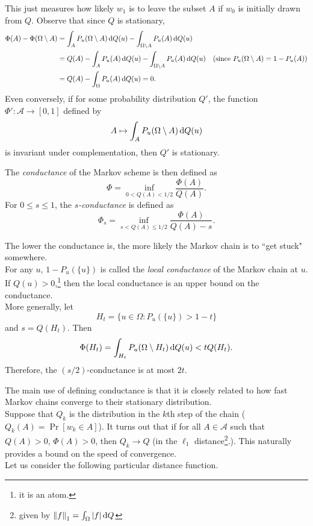 This just measures how likely $w_1$ is to leave the subset $A$ if $w_0$ is initially drawn from $Q$. Observe that since $Q$ is stationary,
\begin{align*}
    \Phi(A) - \Phi(\Omega\setminus A) &= \int_A P_u(\Omega\setminus A)\operatorname{d}\!{Q}(u) - \int_{\Omega\setminus A} P_u(A)\operatorname{d}\!{Q}(u) \\
    &= Q(A) - \int_A P_u(A)\operatorname{d}\!{Q}(u) - \int_{\Omega\setminus A} P_u(A)\operatorname{d}\!{Q}(u) & (\text{since } P_u(\Omega\setminus A)=1-P_u(A)) \\
    &= Q(A) - \int_\Omega P_u(A)\operatorname{d}\!{Q}(u) = 0.
\end{align*}
Even conversely, if for some probability distribution $Q'$, the function $\Phi':\mathcal{A}\to[0,1]$ defined by
\[ A\mapsto \int_A P_u(\Omega\setminus A)\operatorname{d}\!{Q}(u) \]
is invariant under complementation, then $Q'$ is stationary.\\

\begin{fdef}
The \textit{conductance} of the Markov scheme is then defined as
\[ \Phi = \inf_{0<Q(A)<1/2} \frac{\Phi(A)}{Q(A)}. \]
For $0\leq s\leq 1$, the \textit{$s$-conductance} is defined as
\[ \Phi_s = \inf_{s < Q(A) \leq 1/2} \frac{\Phi(A)}{Q(A)-s}. \]
\end{fdef}

The lower the conductance is, the more likely the Markov chain is to ``get stuck" somewhere.\\

For any $u$, $1-P_u(\{u\})$ is called the \textit{local conductance} of the Markov chain at $u$. If $Q(u)>0$,\footnote{it is an atom.} then the local conductance is an upper bound on the conductance.\\
More generally, let
\[ H_t = \{u\in\Omega:P_u(\{u\}) > 1-t\} \]
and $s=Q(H_t)$. Then
\[ \Phi(H_t) = \int_{H_t} P_u(\Omega\setminus H_t)\operatorname{d}\!{Q}(u) < t Q(H_t). \]
Therefore, the $(s/2)$-conductance is at most $2t$.

The main use of defining conductance is that it is closely related to how fast Markov chains converge to their stationary distribution.\\
Suppose that $Q_k$ is the distribution in the $k$th step of the chain ($Q_k(A)=\Pr[w_k\in A]$). It turns out that if for all $A\in\mathcal{A}$ such that $Q(A)>0$, $\Phi(A)>0$, then $Q_k\to Q$ (in the $\ell_1$ distance\footnote{given by $\left\lVert f\right\rVert_1 = \int_\Omega |f|\operatorname{d}\!{Q}$}.). This naturally provides a bound on the speed of convergence.\\
Let us consider the following particular distance function.

